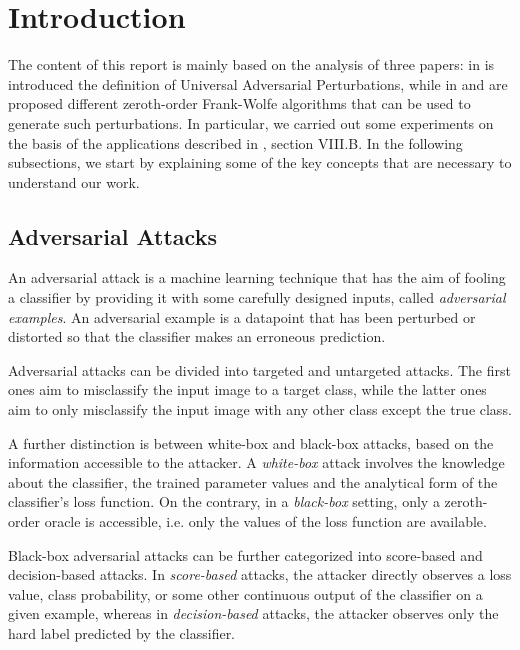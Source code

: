 \section{Introduction}
The content of this report is mainly based on the analysis of three papers:
in \cite{A2} is introduced the definition of Universal Adversarial Perturbations, while in \cite{A3} and
\cite{A4} are proposed different zeroth-order Frank-Wolfe algorithms that can be used to generate such perturbations. In particular, we carried out some experiments 
on the basis of the applications described in \cite{A3}, section VIII.B.
In the following subsections, we start by explaining some of the key concepts that are necessary to understand our work.

\subsection{Adversarial Attacks}
An adversarial attack is a machine learning technique that has the aim of fooling a classifier by providing it with some
carefully designed inputs, called \textit{adversarial examples}. An adversarial example is a datapoint that has
been perturbed or distorted so that the classifier makes an erroneous prediction.

Adversarial attacks can be divided into targeted and untargeted attacks. The first ones aim to
misclassify the input image to a target class, while the latter ones aim to only misclassify
the input image with any other class except the true class.

A further distinction is between white-box and black-box attacks, based on
the information accessible to the attacker. A \textit{white-box} attack involves the knowledge about the classifier, the trained
parameter values and the analytical form of the classifier's loss function. On
the contrary, in a \textit{black-box} setting, only a zeroth-order oracle is accessible, i.e. only the values of the loss function are available.

Black-box adversarial attacks can be further categorized into score-based and decision-based attacks.
In \textit{score-based} attacks, the attacker directly observes a loss value, class probability, or some other
continuous output of the classifier on a given example, whereas in \textit{decision-based} attacks, the attacker
observes only the hard label predicted by the classifier.


